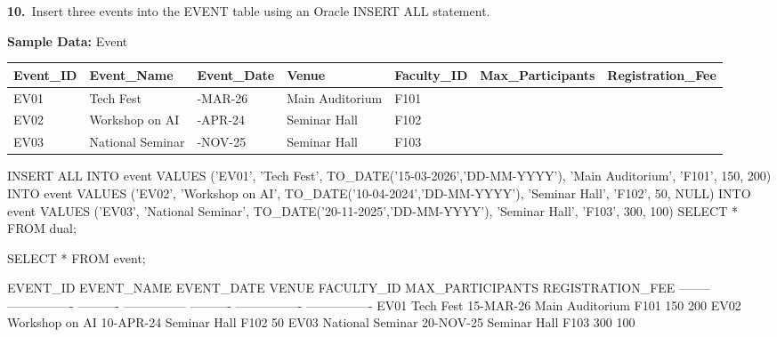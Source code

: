 \noindent\begin{minipage}{\linewidth}
\begingroup{}
{\fontsize{14}{17}\selectfont\textbf{10.}}\ Insert three events into the EVENT table using an Oracle INSERT ALL statement.\par
\endgroup\vspace{12pt}

\noindent\textbf{Sample Data:} Event\par
\vspace{6pt}
{\scriptsize\setlength{\tabcolsep}{4pt}
\renewcommand{\arraystretch}{1.25}
\noindent\begin{tabular}{|>{\raggedright\arraybackslash}p{47.3pt}|>{\raggedright\arraybackslash}p{70.6pt}|>{\raggedright\arraybackslash}p{54.4pt}|>{\raggedright\arraybackslash}p{70.2pt}|>{\raggedright\arraybackslash}p{53.1pt}|>{\raggedleft\arraybackslash}p{75.7pt}|>{\raggedleft\arraybackslash}p{72.6pt}|}
\hline
\textbf{Event\_ID} & \textbf{Event\_Name} & \textbf{Event\_Date} & \textbf{Venue} & \textbf{Faculty\_ID} & \textbf{Max\_Participants} & \textbf{Registration\_Fee} \\ \hline
EV01 & Tech Fest & 15-MAR-26 & Main Auditorium & F101 & 150 & 200 \\ \hline
EV02 & Workshop on AI & 10-APR-24 & Seminar Hall & F102 & 50 &  \\ \hline
EV03 & National Seminar & 20-NOV-25 & Seminar Hall & F103 & 300 & 100 \\ \hline
\end{tabular}\par}
\vspace{14pt}

\begin{sqlcode}
INSERT ALL
  INTO event VALUES ('EV01', 'Tech Fest', TO_DATE('15-03-2026','DD-MM-YYYY'),
                     'Main Auditorium', 'F101', 150, 200)
  INTO event VALUES ('EV02', 'Workshop on AI', TO_DATE('10-04-2024','DD-MM-YYYY'),
                     'Seminar Hall', 'F102', 50, NULL)
  INTO event VALUES ('EV03', 'National Seminar', TO_DATE('20-11-2025','DD-MM-YYYY'),
                     'Seminar Hall', 'F103', 300, 100)
SELECT * FROM dual;

SELECT * FROM event;
\end{sqlcode}

\vspace{18pt}


\begin{sqlout}[fontsize=\scriptsize]
EVENT_ID  EVENT_NAME        EVENT_DATE  VENUE            FACULTY_ID  MAX_PARTICIPANTS  REGISTRATION_FEE
--------  ----------------  ----------  ---------------  ----------  ----------------  ----------------
EV01      Tech Fest         15-MAR-26   Main Auditorium  F101                     150               200
EV02      Workshop on AI    10-APR-24   Seminar Hall     F102                      50
EV03      National Seminar  20-NOV-25   Seminar Hall     F103                     300               100


\end{sqlout}
\end{minipage}
